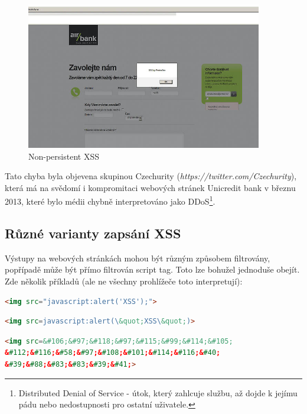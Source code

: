 \documentclass[12pt, a4paper]{report}
\begin{document}
\begin{figure}[h!]
\includegraphics[width=390px]{./examples/xss-airbank.png}
\caption{Non-persistent XSS}
\label{obr.airbank}
\end{figure}

Tato chyba byla objevena skupinou Czechurity (\textit{https://twitter.com/Czechurity}), která má na svědomí i kompromitaci webových stránek Unicredit bank v březnu 2013, které bylo médii chybně interpretováno jako DDoS\footnote{Distributed Denial of Service - útok, který zahlcuje službu, až dojde k jejímu pádu nebo nedostupnosti pro ostatní uživatele.}.

\subsection{Různé varianty zapsání XSS}
Výstupy na webových stránkách mohou být různým způsobem filtrovány, popřípadě může být přímo filtrován script tag. Toto lze bohužel jednoduše obejít. Zde několik příkladů (ale ne všechny prohlížeče toto interpretují):

\begin{lstlisting}[label=some-code, language=HTML, caption=Schování JavaScriptu do neexistujícího obrázku]
<img src="javascript:alert('XSS');">
\end{lstlisting}

\begin{lstlisting}[label=some-code, language=HTML, caption=Zakázané uvozovky? Nahrazení entitami \ldots]
<img src=javascript:alert(\&quot;XSS\&quot;)>
\end{lstlisting}

\begin{lstlisting}[label=some-code, language=HTML, caption=Další možností je převedení na unikód]
<img src=&#106;&#97;&#118;&#97;&#115;&#99;&#114;&#105;
&#112;&#116;&#58;&#97;&#108;&#101;&#114;&#116;&#40;
&#39;&#88;&#83;&#83;&#39;&#41;>
\end{lstlisting}
\end{document}

